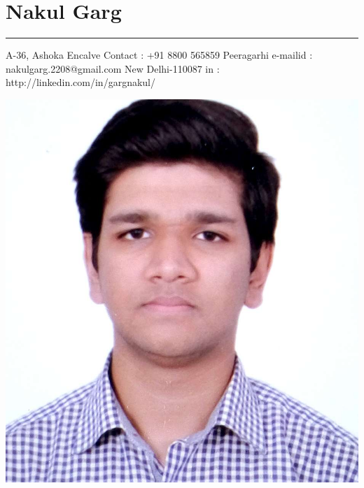 \documentclass[a4paper]{article}
\author{Nakul Garg}
\begin{document}
	\section*{\center\textbf\Huge Nakul Garg}
		\hrule
		
		\vspace{2mm}
		A-36, Ashoka Encalve  \hfill {Contact : +91 8800 565859} \newline
		Peeragarhi \hfill {e-mailid : nakulgarg.2208@gmail.com} \newline
		New Delhi-110087 \hfill  {in : http://linkedin.com/in/gargnakul/} \\ 
		\begin{center}
		\includegraphics[scale=0.08]{profile}
		\end{center}
		\centering
\end{document}
